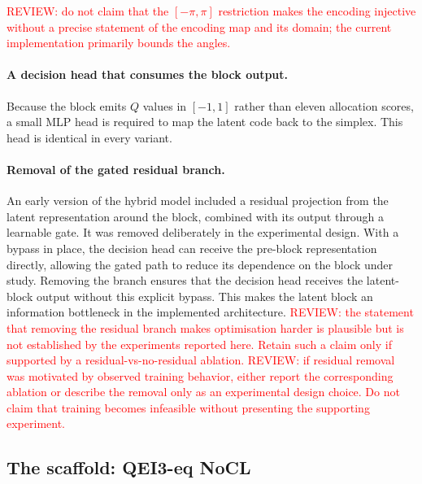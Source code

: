 \documentclass[aps,floatfix,superscriptaddress,twocolumn,tightenlines,amsmath,amssymb,nofootinbib,10pt,longbibliography,prl]{revtex4-2}
\begin{document}
\textcolor{red}{REVIEW: do not claim that the $[-\pi,\pi]$ restriction makes
the encoding injective without a precise statement of the encoding map and its domain; the
current implementation primarily bounds the angles.}

\paragraph{A decision head that consumes the block output.}
Because the block emits $Q$ values in $[-1,1]$ rather than eleven allocation scores, a small
MLP head is required to map the latent code back to the simplex. This head is identical in
every variant.

\paragraph{Removal of the gated residual branch.}
An early version of the hybrid model included a residual projection from the latent
representation around the block, combined with its output through a learnable gate. It was
removed deliberately in the experimental design. With a bypass in place, the decision head
can receive the pre-block representation directly, allowing the gated path to reduce its
dependence on the block under study. Removing the branch ensures that the decision head
receives the latent-block output without this explicit bypass. This makes the latent block
an information bottleneck in the implemented architecture.
\textcolor{red}{REVIEW: the statement that removing the residual branch makes
optimisation harder is plausible but is not established by the experiments reported here.
Retain such a claim only if supported by a residual-vs-no-residual ablation.}
\textcolor{red}{REVIEW: if residual removal was motivated by observed training
behavior, either report the corresponding ablation or describe the removal only as an
experimental design choice. Do not claim that training becomes infeasible without presenting
the supporting experiment.}

\subsection{The scaffold: QEI3-eq NoCL}
\label{subsec:arch-nolayer}
\end{document}
